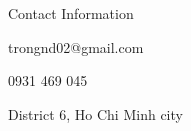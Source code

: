\documentclass[11pt]{spidercv}
\begin{document}
	\PrintableMode
	\begin{TopBar}{\ColorTextSide}
		\SimpleSeparator{\ColorHighlight}
		Contact Information
		\SimpleSeparator{\ColorHighlight}
		\begin{DoubleColumns}
			\begin{ItemList}{\ColorHighlight}
				\item [\Large\faGoogle] trongnd02@gmail.com
				\item [\Large\faMobile] 0931 469 045
			\end{ItemList}
			\nextcolumn
			\begin{ItemList}{\ColorHighlight}
			\item [\Large\faHome] District 6, Ho Chi Minh city
			\end{ItemList}
		\end{DoubleColumns}
	\end{TopBar}
\end{document}
